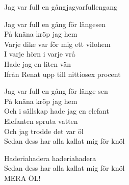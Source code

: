 \begin{song}{Jag var full en gång}{jagvarfullengang}
\begin{vers}
Jag var full en gång för längesen\\
På knäna kröp jag hem\\
Varje dike var för mig ett vilohem\\
I varje hörn i varje vrå\\
Hade jag en liten vän\\
Ifrån Renat upp till nittiosex procent\\
\end{vers}
\begin{vers}
Jag var full en gång för länge sen\\
På knäna kröp jag hem\\
Och i sällskap hade jag en elefant\\
Elefanten spruta vatten\\
Och jag trodde det var öl\\
Sedan dess har alla kallat mig för knöl\\
\end{vers}
\begin{vers}
Haderiahadera haderiahadera\\
Sedan dess har alla kallat mig för knöl\\
MERA ÖL!\\
\end{vers}
\end{song}
